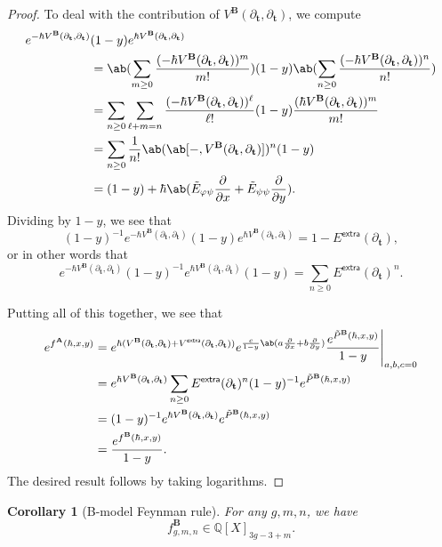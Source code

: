 \documentclass[10pt]{amsart}
\newtheorem{cor}[thm]{Corollary}
\theoremstyle{definition}
\theoremstyle{remark}
\theoremstyle{plain}
\theoremstyle{definition}
\theoremstyle{remark}
\newcommand{\Q}{\mathbb{Q}}
\newcommand{\bA}{\mathbf{A}}
\newcommand{\bB}{\mathbf{B}}
\newcommand{\bt}{\mathbf{t}}
\newcommand{\ms}[1]{\mathsf{#1}}
\newcommand{\1}{\mathbf{1}}
\newcommand{\2}{\mathbf{2}}
\newcommand{\3}{\mathbf{3}}
\newcommand{\extra}{\ms{extra}}
\numberwithin{equation}{section}
\begin{document}
\begin{proof}
    To deal with the contribution of $V^{\bB}(\partial_{\bt}, \partial_{\bt})$, we compute
    \begin{align*}
        e^{-\hbar V^{\bB}(\partial_{\bt}, \partial_{\bt})}&(1-y)e^{\hbar V^{\bB}(\partial_{\bt}, \partial_{\bt})} \\ 
        &= \ab(\sum_{m\geq 0} \frac{(-\hbar V^{\bB}(\partial_{\bt}, \partial_{\bt}))^m}{m!})(1-y) \ab(\sum_{n\geq 0} \frac{(-\hbar V^{\bB}(\partial_{\bt}, \partial_{\bt}))^n}{n!}) \\
        &= \sum_{n \geq 0} \sum_{\ell+m = n} \frac{(-\hbar V^{\bB}(\partial_{\bt}, \partial_{\bt}))^{\ell}}{\ell!}(1-y) \frac{(\hbar V^{\bB}(\partial_{\bt}, \partial_{\bt}))^m}{m!} \\
        &= \sum_{n \geq 0}\frac{1}{n!} \ab(\ab[-,V^{\bB}(\partial_{\bt}, \partial_{\bt})])^n (1-y) \\
        &= (1-y) + \hbar\ab(\tilde{E}_{\varphi\psi} \pdv{}{x} + \tilde{E}_{\psi\psi} \pdv{}{y}).
    \end{align*}
    Dividing by $1-y$, we see that
    \[ (1-y)^{-1} e^{-\hbar V^{\bB}(\partial_{\bt}, \partial_{\bt})}(1-y)e^{\hbar V^{\bB}(\partial_{\bt}, \partial_{\bt})} = 1-E^{\extra}(\partial_{\bt}), \] 
    or in other words that
    \[  e^{-\hbar V^{\bB}(\partial_{\bt}, \partial_{\bt})}(1-y)^{-1}e^{\hbar V^{\bB}(\partial_{\bt}, \partial_{\bt})} (1-y) = \sum_{n \geq 0} E^{\extra}(\partial_{\bt})^n.\]

    Putting all of this together, we see that
    \begin{align*}
        e^{f^{\bA}(\hbar, x, y)}
        ={}& e^{\hbar(V^{\bB}(\partial_{\bt}, \partial_{\bt})+V^{\extra}(\partial_{\bt}, \partial_{\bt}))} e^{\frac{c}{1-y}\ab(a\pdv{}{x}+b\pdv{}{y})}\frac{e^{\tilde{P}^{\bB}(\hbar, x, y)}}{1-y} \Bigg|_{a,b,c=0} \\
        ={}& e^{\hbar V^{\bB}(\partial_{\bt}, \partial_{\bt})} \sum_{n \geq 0} E^{\extra}(\partial_{\bt})^n (1-y)^{-1} e^{\tilde{P}^{\bB}(\hbar, x, y)} \\
        ={}& (1-y)^{-1} e^{\hbar V^{\bB}(\partial_{\bt}, \partial_{\bt})} e^{\tilde{P}^{\bB}(\hbar, x, y)} \\
        ={}& \frac{e^{f^{\bB}(\hbar, x, y)}}{1-y}.
    \end{align*}
    The desired result follows by taking logarithms.
\end{proof}

\begin{cor}[B-model Feynman rule]\label{cor:bmodelfeynman}
    For any $g,m,n$, we have
    \[ f^{\bB}_{g,m,n} \in \Q[X]_{3g-3+m}. \]
\end{cor}
\end{document}
